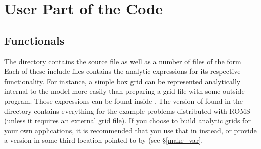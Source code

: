 \section{User Part of the Code}
\label{User}


\subsection{Functionals}
\label{My_funs}

The directory  contains the source file
 as well as a number of files of the form
 Each of these include files contains the analytic
expressions for its respective functionality. For instance, a simple
box grid can be represented analytically internal to the model more
easily than preparing a grid file with some outside program. Those
expressions can be found inside . The version of
 found in the  directory contains
everything for the example problems distributed with ROMS (unless
it requires an external grid file). If you choose to build analytic
grids for your own applications, it is recommended that you use that
in  instead, or provide a version in some third
location pointed to by  (see \S\ref{make_var}.


